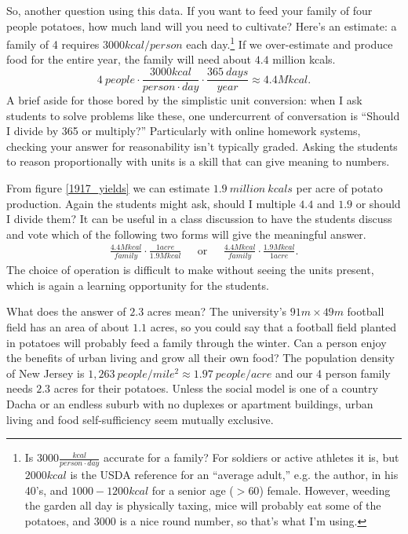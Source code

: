 \documentclass[jou]{apa7}
\newcommand{\be}{\begin{equation}}
\newcommand{\ee}{\end{equation}}
\newcommand{\bea}{\begin{eqnarray}}
\newcommand{\eea}{\end{eqnarray}}
\begin{document}
So, another question using this data.  If you want to feed your family of four people potatoes, how much land will you need to cultivate?
Here's an estimate: a family of 4 requires $3000kcal/person$ each day.\footnote{
Is $3000\frac{kcal}{person\cdot day}$ accurate for a family?  For soldiers or active athletes it is, but $2000kcal$ is the USDA reference for an ``average adult,'' e.g. the author, in his 40's, and   $1000-1200kcal$ for a senior age ($>60$) female.  However, weeding the garden all day is physically taxing, mice will probably eat some of the potatoes, and $3000$ is a nice round number, so that's what I'm using.
}
If we over-estimate and produce food for the entire year, the family will need about $4.4$ million kcals.
\be
4~people\cdot\frac{3000kcal}{person\cdot day}\cdot\frac{365~days}{year} \approx 4.4 M kcal . 
\ee
A brief aside for those bored by the simplistic unit conversion: when I ask students to solve problems like these, one undercurrent of conversation is ``Should I divide by 365 or multiply?''  Particularly with online homework systems, checking your answer for reasonability isn't  typically graded. Asking the students to reason proportionally with units is a skill that can give meaning to numbers. 

From figure \ref{1917_yields} we can estimate $1.9~million~kcals$ per acre of potato production.  Again the students might ask, should I multiple $4.4$ and $1.9$ or should I divide them?  It can be useful in a class discussion to have the students discuss and vote which of the following two forms will give the meaningful answer.
\bea
\frac{4.4 M kcal}{family}\cdot\frac{1 acre}{1.9M kcal}  & \textrm{~~or~~}&
\frac{4.4 M kcal}{family}\cdot\frac{1.9M kcal}{1 acre} .
\eea
The choice of operation is difficult to make without seeing the units present, which is again a learning opportunity for the students.

What does the answer of $2.3$ acres mean?  The university's $91m\times49m$ football field has an area of about $1.1$ acres, so you could say that a football field planted in potatoes will probably feed a family through the winter.\cite{Deppe}  Can a person enjoy the benefits of urban living and grow all their own food?  The population density of New Jersey is $1,263~people/mile^2 \approx1.97~people/acre$ and our 4 person family needs $2.3$ acres for their potatoes.  
Unless the social model is one of a country Dacha or an endless suburb with no duplexes or apartment buildings, urban living and food self-sufficiency seem mutually exclusive.
\end{document}
